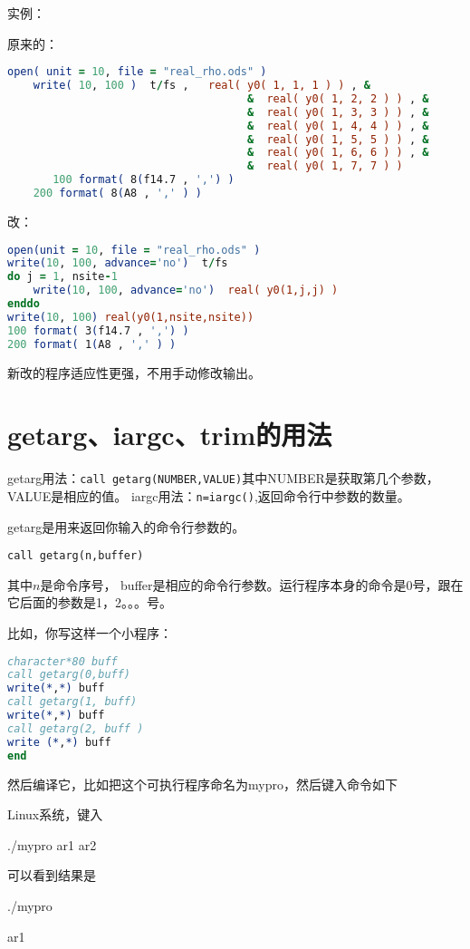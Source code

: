 实例：

原来的：
\begin{lstlisting}[language=Fortran]
	open( unit = 10, file = "real_rho.ods" )
	write( 10, 100 )  t/fs ,   real( y0( 1, 1, 1 ) ) , &
                                     &  real( y0( 1, 2, 2 ) ) , &
                                     &  real( y0( 1, 3, 3 ) ) , &
                                     &  real( y0( 1, 4, 4 ) ) , &
                                     &  real( y0( 1, 5, 5 ) ) , &
                                     &  real( y0( 1, 6, 6 ) ) , &
                                     &  real( y0( 1, 7, 7 ) )
       100 format( 8(f14.7 , ',') )
	200 format( 8(A8 , ',' ) )
\end{lstlisting}

改：
\begin{lstlisting}[language=Fortran]
open(unit = 10, file = "real_rho.ods" )
write(10, 100, advance='no')  t/fs
do j = 1, nsite-1
	write(10, 100, advance='no')  real( y0(1,j,j) ) 
enddo
write(10, 100) real(y0(1,nsite,nsite))
100 format( 3(f14.7 , ',') )
200 format( 1(A8 , ',' ) )
\end{lstlisting}
新改的程序适应性更强，不用手动修改输出。



\section{getarg、iargc、trim的用法}
getarg用法：\verb|call getarg(NUMBER,VALUE)|其中NUMBER是获取第几个参数，VALUE是相应的值。
iargc用法：\verb|n=iargc()|,返回命令行中参数的数量。

getarg是用来返回你输入的命令行参数的。

\verb|call getarg(n,buffer)|

其中$n$是命令序号， buffer是相应的命令行参数。运行程序本身的命令是0号，跟在它后面的参数是1，2。。。号。

比如，你写这样一个小程序：
\begin{lstlisting}[language=Fortran]
character*80 buff
call getarg(0,buff)
write(*,*) buff
call getarg(1, buff)
write(*,*) buff
call getarg(2, buff )
write (*,*) buff
end
\end{lstlisting}
然后编译它，比如把这个可执行程序命名为mypro，然后键入命令如下

Linux系统，键入

./mypro   ar1 ar2

可以看到结果是

./mypro

ar1


